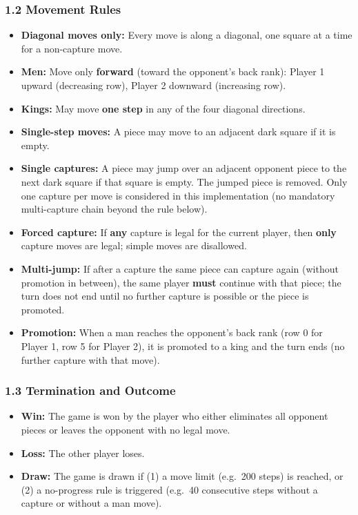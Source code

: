 \documentclass[
]{article}
\providecommand{\tightlist}{%
  \setlength{\itemsep}{0pt}\setlength{\parskip}{0pt}}
\begin{document}
\subsubsection{1.2 Movement Rules}\label{movement-rules}

\begin{itemize}
\tightlist
\item
  \textbf{Diagonal moves only:} Every move is along a diagonal, one
  square at a time for a non-capture move.
\item
  \textbf{Men:} Move only \textbf{forward} (toward the opponent's back
  rank): Player 1 upward (decreasing row), Player 2 downward (increasing
  row).
\item
  \textbf{Kings:} May move \textbf{one step} in any of the four diagonal
  directions.
\item
  \textbf{Single-step moves:} A piece may move to an adjacent dark
  square if it is empty.
\item
  \textbf{Single captures:} A piece may jump over an adjacent opponent
  piece to the next dark square if that square is empty. The jumped
  piece is removed. Only one capture per move is considered in this
  implementation (no mandatory multi-capture chain beyond the rule
  below).
\item
  \textbf{Forced capture:} If \textbf{any} capture is legal for the
  current player, then \textbf{only} capture moves are legal; simple
  moves are disallowed.
\item
  \textbf{Multi-jump:} If after a capture the same piece can capture
  again (without promotion in between), the same player \textbf{must}
  continue with that piece; the turn does not end until no further
  capture is possible or the piece is promoted.
\item
  \textbf{Promotion:} When a man reaches the opponent's back rank (row 0
  for Player 1, row 5 for Player 2), it is promoted to a king and the
  turn ends (no further capture with that move).
\end{itemize}

\subsubsection{1.3 Termination and
Outcome}\label{termination-and-outcome}

\begin{itemize}
\tightlist
\item
  \textbf{Win:} The game is won by the player who either eliminates all
  opponent pieces or leaves the opponent with no legal move.
\item
  \textbf{Loss:} The other player loses.
\item
  \textbf{Draw:} The game is drawn if (1) a move limit (e.g.~200 steps)
  is reached, or (2) a no-progress rule is triggered (e.g.~40
  consecutive steps without a capture or without a man move).
\end{itemize}
\end{document}
